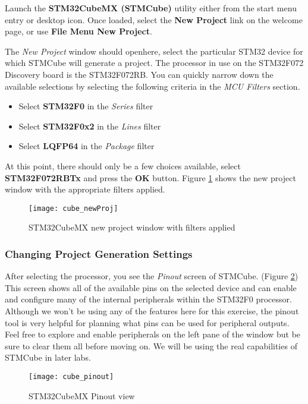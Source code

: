 \documentclass[openany,11pt,fleqn]{book} %
\begin{document}
Launch the \textbf{STM32CubeMX (STMCube)} utility either from the start menu entry or desktop icon. Once loaded, select the \textbf{New Project} link on the welcome page, or use \textbf{File Menu \textrightarrow New Project}.

\noindent
The \textit{New Project} window should open\textemdash here, select the particular STM32 device for which STMCube will generate a project. The processor in use on the STM32F072 Discovery board is the STM32F072RB. You can quickly narrow down the available selections by selecting the following criteria in the \textit{MCU Filters} section.
\begin{itemize}
	\item Select \textbf{STM32F0} in the \textit{Series} filter
	\item Select \textbf{STM32F0x2} in the \textit{Lines} filter
	\item Select \textbf{LQFP64} in the \textit{Package} filter
\end{itemize}
At this point, there should only be a few choices available, select \textbf{STM32F072RBTx} and press the \textbf{OK} button. Figure \ref{cube_newProj} shows the new project window with the appropriate filters applied.

\begin{figure}[h]
	\centering\texttt{[image: cube\_newProj]}
	\caption{STM32CubeMX new project window with filters applied}
	\label{cube_newProj}
\end{figure}


\subsubsection*{Changing Project Generation Settings}

After selecting the processor, you see the \textit{Pinout} screen of STMCube. (Figure \ref{cube_pinout}) This screen shows all of the available pins on the selected device and can enable and configure many of the internal peripherals within the STM32F0 processor. Although we won't be using any of the features here for this exercise, the pinout tool is very helpful for planning what pins can be used for peripheral outputs. Feel free to explore and enable peripherals on the left pane of the window but be sure to clear them all before moving on. We will be using the real capabilities of STMCube in later labs.

\begin{figure}[h!]
	\centering\texttt{[image: cube\_pinout]}
	\caption{STM32CubeMX Pinout view}
	\label{cube_pinout}
\end{figure}
\end{document}
